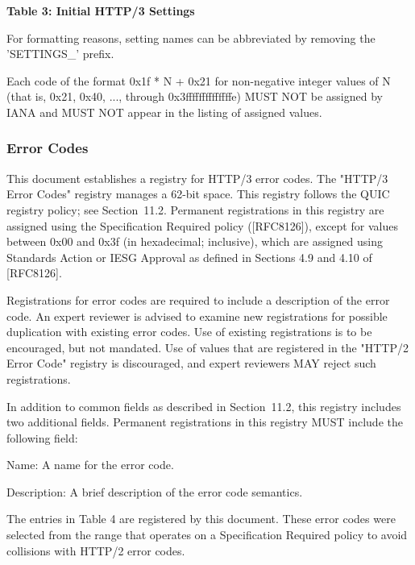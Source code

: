 \documentclass{article}
\begin{document}
\begin{center}
\textbf{Table 3: Initial HTTP/3 Settings}
\end{center}

For formatting reasons, setting names can be abbreviated by removing the 'SETTINGS\_' prefix.

Each code of the format 0x1f * N + 0x21 for non-negative integer values of N (that is, 0x21, 0x40, ..., through 0x3ffffffffffffffe) MUST NOT be assigned by IANA and MUST NOT appear in the listing of assigned values.

\subsubsection{Error Codes}

This document establishes a registry for HTTP/3 error codes.  The "HTTP/3 Error Codes" registry manages a 62-bit space.  This registry follows the QUIC registry policy; see Section~11.2.  Permanent registrations in this registry are assigned using the Specification Required policy ([RFC8126]), except for values between 0x00 and 0x3f (in hexadecimal; inclusive), which are assigned using Standards Action or IESG Approval as defined in Sections 4.9 and 4.10 of [RFC8126].

Registrations for error codes are required to include a description of the error code.  An expert reviewer is advised to examine new registrations for possible duplication with existing error codes. Use of existing registrations is to be encouraged, but not mandated. Use of values that are registered in the "HTTP/2 Error Code" registry is discouraged, and expert reviewers MAY reject such registrations.

In addition to common fields as described in Section~11.2, this registry includes two additional fields.  Permanent registrations in this registry MUST include the following field:

Name:  A name for the error code.

Description:  A brief description of the error code semantics.

The entries in Table 4 are registered by this document.  These error codes were selected from the range that operates on a Specification Required policy to avoid collisions with HTTP/2 error codes.
\end{document}
